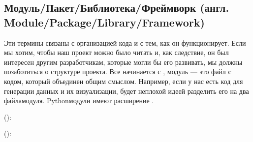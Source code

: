 \documentclass[letterpaper,10pt,russian]{sphinxmanual}
\begin{document}
\subsection{Модуль/Пакет/Библиотека/Фреймворк (англ. Module/Package/Library/Framework)}
\label{\detokenize{educational_materials/terms/content:module-package-library-framework}}
\sphinxAtStartPar
Эти термины связаны с организацией кода и с тем, как он функционирует. Если мы хотим, чтобы наш проект можно было читать и, как следствие, он был интересен другим разработчикам, которые могли бы его развивать, мы должны позаботиться о структуре проекта. Все начинается с , модуль — это файл с кодом, который объединен общим смыслом. Например, если у нас есть код для генерации данных и их визуализации, будет неплохой идеей разделить его на два файла\sphinxhyphen{}модуля.  Python\sphinxhyphen{}модули имеют расширение .

\sphinxAtStartPar
():

\begin{sphinxVerbatim}[commandchars=\\\{\}]
 
     
    
  
     \PYG{p}{[}    \PYG{p}{]}
\end{sphinxVerbatim}

\sphinxAtStartPar
():

\begin{sphinxVerbatim}[commandchars=\\\{\}]
   

 
    
 
      \PYG{p}{[}    \PYG{p}{]}
     
\end{sphinxVerbatim}
\end{document}
